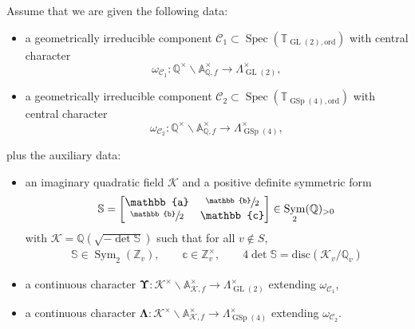 \documentclass[10pt]{amsart}
\theoremstyle{plain}
\theoremstyle{remark}
\let\mr\mathrm
\newcommand{\bA}{\mathbb{A}}
\newcommand{\bQ}{\mathbb{Q}}
\newcommand{\bS}{\mathbb{S}}
\newcommand{\bT}{\mathbb{T}}
\newcommand{\bZ}{\mathbb{Z}}
\newcommand{\bba}{\mathbb{a}}
\newcommand{\bbb}{\mathbb{b}}
\newcommand{\bbc}{\mathbb{c}}
\newcommand{\cK}{\mathcal{K}}
\newcommand{\sC}{\mathscr{C}}
\DeclareMathOperator{\GL}{GL}
\DeclareMathOperator{\GSp}{GSp}
\newcommand{\ord}{\mathrm{ord}}
\DeclareMathOperator{\Spec}{Spec}
\DeclareMathOperator{\Sym}{Sym}
\newcommand{\bLam}{\boldsymbol\Lambda}
\newcommand{\bUps}{\boldsymbol\Upsilon}
\begin{document}
\pagebreak[2]
Assume that we are given the following data:
\begin{itemize}
\item
a geometrically irreducible component $\sC_1\subset \Spec(\bT_{\GL(2),\ord})$ with central character
\[
\omega_{\sC_1}:\bQ^\times\backslash\bA^\times_{\bQ,f}\to \Lambda^\times_{\GL(2)},
\]
\item
a geometrically irreducible component $\sC_2\subset \Spec(\bT_{\GSp(4),\ord})$ with central character
\[
\omega_{\sC_2}:\bQ^\times\backslash\bA^\times_{\bQ,f}\to \Lambda^\times_{\GSp(4)},
\]
\end{itemize}
plus the auxiliary data:
\begin{itemize}
\item
an imaginary quadratic field $\cK$ and a positive definite symmetric form
\[\bS=\begin{bmatrix}\bba&\sfrac{\bbb}{2}\\ \sfrac{\bbb}{2}&\bbc\end{bmatrix}\in\Sym_2(\bQ)_{>0}
\]
with $\cK=\bQ(\sqrt{-\det\bS})$ such that for all $v\notin S$,
\begin{align*}
\bS\in \Sym_2(\bZ_v),
\qquad\bbc\in \bZ^\times_v,
\qquad 4\det\bS=\mr{disc}(\cK_v/\bQ_v)
\end{align*}
\item
a continuous character $\bUps:\cK^\times\backslash\bA^\times_{\cK,f}\to \Lambda^\times_{\GL(2)}$ extending $\omega_{\sC_1}$,
\item
a continuous character $\bLam:\cK^\times\backslash\bA^\times_{\cK,f}\to \Lambda^\times_{\GSp(4)}$ extending $\omega_{\sC_2}$.
\end{itemize}
\end{document}
